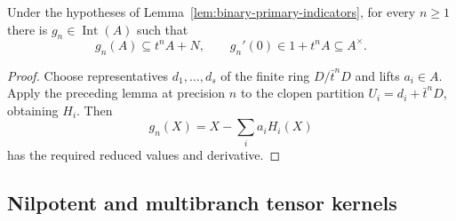 \begin{lemma}
\label{lem:binary-primary-small-values}
Under the hypotheses of Lemma~\ref{lem:binary-primary-indicators},
for every $n\ge1$ there is $g_n\in\operatorname{Int}(A)$ such that
\[
 g_n(A)\subseteq t^nA+N,\qquad
 g_n'(0)\in1+t^nA\subseteq A^\times .
\]
\end{lemma}
\begin{proof}
Choose representatives $d_1,\ldots,d_s$ of the finite ring
$D/\bar t^nD$ and lifts $a_i\in A$.  Apply the preceding lemma
at precision $n$ to the clopen partition
$U_i=d_i+\bar t^nD$, obtaining $H_i$.
Then
\[
 g_n(X)=X-\sum_i a_iH_i(X)
\]
has the required reduced values and derivative.
\end{proof}

\subsection{Nilpotent and multibranch tensor kernels}

